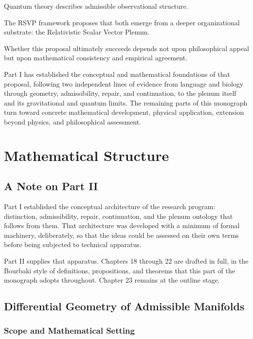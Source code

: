 \documentclass[11pt,oneside]{book}
\numberwithin{equation}{chapter}
\theoremstyle{definition}
\theoremstyle{plain}
\begin{document}
Quantum theory describes admissible observational structure.

The RSVP framework proposes that both emerge from a deeper organizational
substrate: the Relativistic Scalar Vector Plenum.

Whether this proposal ultimately succeeds depends not upon philosophical
appeal but upon mathematical consistency and empirical agreement.

Part I has established the conceptual and mathematical foundations of that
proposal, following two independent lines of evidence from language and
biology through geometry, admissibility, repair, and continuation, to the
plenum itself and its gravitational and quantum limits. The remaining parts
of this monograph turn toward concrete mathematical development, physical
application, extension beyond physics, and philosophical assessment.


\part{Mathematical Structure}

\chapter*{A Note on Part II}

Part I established the conceptual architecture of the research program:
distinction, admissibility, repair, continuation, and the plenum ontology
that follows from them. That architecture was developed with a minimum of
formal machinery, deliberately, so that the ideas could be assessed on their
own terms before being subjected to technical apparatus.

Part II supplies that apparatus. Chapters 18 through 22 are drafted in full,
in the Bourbaki style of definitions, propositions, and theorems that this
part of the monograph adopts throughout. Chapter 23 remains at the outline
stage.

\chapter{Differential Geometry of Admissible Manifolds}

\section{Scope and Mathematical Setting}
\end{document}
